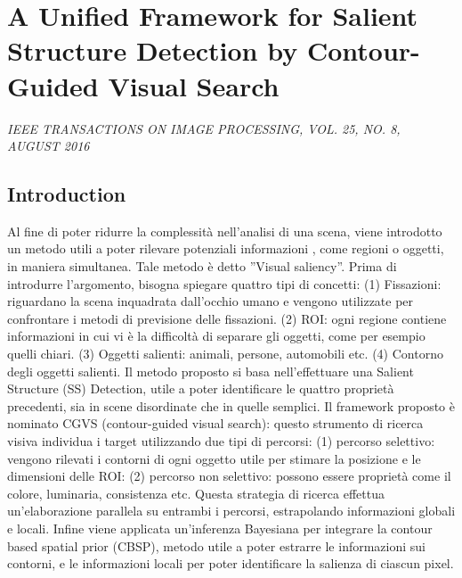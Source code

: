 \section{A Unified Framework for Salient Structure Detection by Contour-Guided Visual Search}

\begin{center}
    \author{
    Kai Fu Yang,
    Hui Li,
    Chao-Yi Li,
    and Young-Jie Li,
   \emph{Member}, 
    IEEE
}
\end{center}

\emph{IEEE TRANSACTIONS ON IMAGE PROCESSING, VOL. 25, NO. 8, AUGUST 2016}

\subsection{Introduction}

Al fine di poter ridurre la complessità nell’analisi di una scena, viene introdotto un metodo utili a poter rilevare potenziali informazioni , come regioni o oggetti, in maniera  simultanea. Tale metodo è detto ”Visual saliency”. Prima di introdurre l’argomento, bisogna spiegare quattro tipi di concetti: (1) Fissazioni: riguardano la scena inquadrata dall’occhio umano e vengono utilizzate per confrontare i metodi di previsione delle fissazioni. (2) ROI: ogni regione contiene informazioni in cui vi è la difficoltà di separare gli oggetti, come per esempio quelli chiari. (3) Oggetti salienti: animali, persone, automobili etc. (4) Contorno degli oggetti salienti. Il metodo proposto si basa nell’effettuare una Salient Structure (SS) Detection, utile a poter identificare le quattro proprietà precedenti, sia in scene disordinate che in quelle semplici. Il framework proposto è nominato CGVS (contour-guided visual search): questo strumento di ricerca visiva individua i target utilizzando due tipi di percorsi: (1) percorso selettivo: vengono rilevati i contorni di ogni oggetto utile per stimare la posizione e le dimensioni delle ROI: (2) percorso non selettivo: possono essere proprietà come il colore, luminaria, consistenza etc.
Questa strategia di ricerca effettua un’elaborazione parallela su entrambi i percorsi, estrapolando informazioni globali e locali. Infine viene applicata un’inferenza Bayesiana per integrare la contour based spatial prior (CBSP), metodo utile a poter estrarre le informazioni sui contorni, e le informazioni locali per poter identificare la salienza di ciascun pixel.
